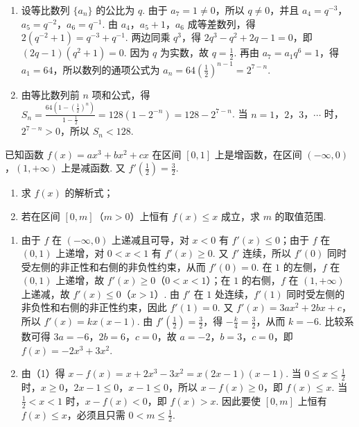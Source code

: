 \begin{solution}
\begin{enumerate}
\item 设等比数列 \(\{a_n\}\) 的公比为 \(q\). 由于 \(a_7=1\neq0\)，所以 \(q\neq0\)，并且 \(a_4=q^{-3}\)，\(a_5=q^{-2}\)，\(a_6=q^{-1}\). 由 \(a_4\)，\(a_5+1\)，\(a_6\) 成等差数列，得 \(2\left(q^{-2}+1\right)=q^{-3}+q^{-1}\). 两边同乘 \(q^3\)，得 \(2q^3-q^2+2q-1=0\)，即 \(\left(2q-1\right)\left(q^2+1\right)=0\). 因为 \(q\) 为实数，故 \(q=\frac12\). 再由 \(a_7=a_1q^6=1\)，得 \(a_1=64\)，所以数列的通项公式为 \(a_n=64\left(\frac12\right)^{n-1}=2^{7-n}\).
\item 由等比数列前 \(n\) 项和公式，得 \(S_n=\frac{64\left(1-\left(\frac12\right)^n\right)}{1-\frac12}=128\left(1-2^{-n}\right)=128-2^{7-n}\). 当 \(n=1\)，\(2\)，\(3\)，\(\cdots\) 时，\(2^{7-n}>0\)，所以 \(S_n<128\).
\end{enumerate}
\end{solution}

\begin{problem}
已知函数 \(f(x) = a x^3 + b x^2 + c x\) 在区间 \([0, 1]\) 上是增函数，在区间 \((-\infty, 0)\)，\((1, +\infty)\) 上是减函数. 又 \(f'\left(\frac{1}{2}\right) = \frac{3}{2}\).

\begin{enumerate}
\item 求 \(f(x)\) 的解析式；
\item 若在区间 \([0, m]\)（\(m > 0\)）上恒有 \(f(x) \leqslant x\) 成立，求 \(m\) 的取值范围.
\end{enumerate}
\end{problem}

\begin{solution}
\begin{enumerate}
\item 由于 \(f\) 在 \((-\infty,0)\) 上递减且可导，对 \(x<0\) 有 \(f'(x)\leqslant0\)；由于 \(f\) 在 \((0,1)\) 上递增，对 \(0<x<1\) 有 \(f'(x)\geqslant0\). 又 \(f'\) 连续，所以 \(f'(0)\) 同时受左侧的非正性和右侧的非负性约束，从而 \(f'(0)=0\). 在 \(1\) 的左侧，\(f\) 在 \((0,1)\) 上递增，故 \(f'(x)\geqslant0\)（\(0<x<1\)）；在 \(1\) 的右侧，\(f\) 在 \((1,+\infty)\) 上递减，故 \(f'(x)\leqslant0\)（\(x>1\)）. 由 \(f'\) 在 \(1\) 处连续，\(f'(1)\) 同时受左侧的非负性和右侧的非正性约束，因此 \(f'(1)=0\). 又 \(f'(x)=3ax^2+2bx+c\)，所以 \(f'(x)=k x\left(x-1\right)\). 由 \(f'\left(\frac12\right)=\frac32\)，得 \(-\frac{k}{4}=\frac32\)，从而 \(k=-6\). 比较系数可得 \(3a=-6\)，\(2b=6\)，\(c=0\)，故 \(a=-2\)，\(b=3\)，\(c=0\)，即 \(f(x)=-2x^3+3x^2\).
\item 由（1）得 \(x-f(x)=x+2x^3-3x^2=x\left(2x-1\right)\left(x-1\right)\). 当 \(0\leqslant x\leqslant\frac12\) 时，\(x\geqslant0\)，\(2x-1\leqslant0\)，\(x-1\leqslant0\)，所以 \(x-f(x)\geqslant0\)，即 \(f(x)\leqslant x\). 当 \(\frac12<x<1\) 时，\(x-f(x)<0\)，即 \(f(x)>x\). 因此要使 \([0,m]\) 上恒有 \(f(x)\leqslant x\)，必须且只需 \(0<m\leqslant\frac12\).
\end{enumerate}
\end{solution}

